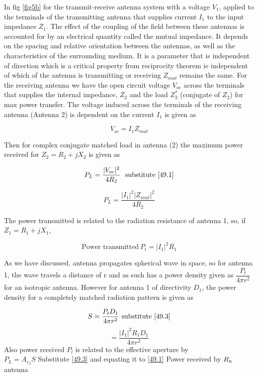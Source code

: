 In fig \ref{fig5b} for the transmit-receive antenna system with a voltage $V_1$, applied to the terminals of the transmitting antenna that supplies current $I_{1}$ to the input impedance $Z_{1}$. The effect of the coupling of the field between these antennas is accounted for by an electrical quantity called the mutual impedance. It depends on the spacing and relative orientation between the antennas, as well as the characteristics of the surrounding medium. It is a parameter that is independent of direction which is a critical property from reciprocity theorem ie independent of which of the antenna is transmitting or receiving $Z_{mut}$ remains the same. For the receiving antenna we have the open circuit voltage $V_{oc}$ across the terminals that supplies the internal impedance, $Z_{2}$ and the load $Z_{2}^*$ (conjugate of $Z_{2}$) for max power transfer.
\newline
The voltage induced across the terminals of the receiving antenna (Antenna 2) is dependent on the current $I_{1}$ is given as

\begin{equation}
\label{49.1}
V_{oc}= I_{1}Z_{mut}
\end{equation}

Then for complex conjugate matched load in antenna (2) the maximum power received for $Z_{2} = R_{2}+jX_{2}$ is given as

$$P_{L}=\dfrac{|V_{oc}|^{2}}{4R_{2}}\
\text{\ substitute\  \ref{49.1}}$$

\begin{equation}
	P_{L} = \dfrac{|I_{1}|^{2}|Z_{mut}|^{2}}{4R_{2}}
\end{equation}


The power transmitted is related to the radiation resistance of antenna 1, so, if $Z_{1}=R_{1}+jX_{1}$,

\begin{equation}
\label{49.3}
\text{Power transmitted}\ P_{t}=|I_{1}|^{2}R_{1}
\end{equation}




As we have discussed, antenna propagates spherical wave in space, so for antenna 1, the wave travels a distance of r and as such has a power density given as $\dfrac{P_{t}}{4\pi r^{2}}$ for an isotropic antenna. However for antenna 1 of directivity $D_{1}$, the power density for a completely matched radiation pattern is given as

$$ S=\dfrac{P_{t} D_{1}}{4\pi r^{2}}\ \text{substitute \ref{49.3}}$$
\begin{equation}
	= \dfrac{|I_{1}|^{2}R_{1}D_{1}}{4\pi r^{2}}
	\label{eqn17b}
\end{equation}
Also power received $P_{l}$ is related to the effective aperture by\\ 
$P_{L}= A_{e_{2}}S$ Substitute \ref{49.3} and equating it to \ref{49.1}\newline
Power received by $R_{\textnormal{x}}$ antenna


